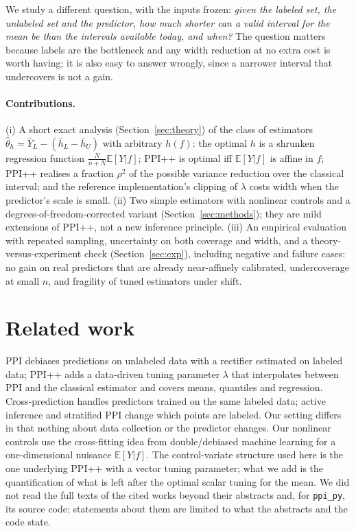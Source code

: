 \documentclass{article}
\newcommand{\E}{\mathbb{E}}
\begin{document}
We study a different question, with the inputs frozen: \emph{given the labeled set, the unlabeled set and the predictor, how much shorter can a valid interval for the mean be than the intervals available today, and when?} The question matters because labels are the bottleneck and any width reduction at no extra cost is worth having; it is also easy to answer wrongly, since a narrower interval that undercovers is not a gain.

\paragraph{Contributions.}
(i) A short exact analysis (Section~\ref{sec:theory}) of the class of estimators $\hat\theta_h=\bar Y_L-(\bar h_L-\bar h_U)$ with arbitrary $h(f)$: the optimal $h$ is a shrunken regression function $\tfrac{N}{n+N}\E[Y|f]$; PPI++ is optimal iff $\E[Y|f]$ is affine in $f$; PPI++ realises a fraction $\rho^2$ of the possible variance reduction over the classical interval; and the reference implementation's clipping of $\lambda$ costs width when the predictor's scale is small. (ii) Two simple estimators with nonlinear controls and a degrees-of-freedom-corrected variant (Section~\ref{sec:methods}); they are mild extensions of PPI++, not a new inference principle. (iii) An empirical evaluation with repeated sampling, uncertainty on both coverage and width, and a theory-versus-experiment check (Section~\ref{sec:exp}), including negative and failure cases: no gain on real predictors that are already near-affinely calibrated, undercoverage at small $n$, and fragility of tuned estimators under shift.

\section{Related work}
PPI \citep{angelopoulos2023ppi} debiases predictions on unlabeled data with a rectifier estimated on labeled data; PPI++ \citep{angelopoulos2023ppipp} adds a data-driven tuning parameter $\lambda$ that interpolates between PPI and the classical estimator and covers means, quantiles and regression. Cross-prediction \citep{zrnic2023cross} handles predictors trained on the same labeled data; active inference \citep{zrnic2024active} and stratified PPI \citep{fisch2024stratified} change which points are labeled. Our setting differs in that nothing about data collection or the predictor changes. Our nonlinear controls use the cross-fitting idea from double/debiased machine learning \citep{chernozhukov2016dml} for a one-dimensional nuisance $\E[Y|f]$. The control-variate structure used here is the one underlying PPI++ with a vector tuning parameter; what we add is the quantification of what is left after the optimal scalar tuning for the mean. We did not read the full texts of the cited works beyond their abstracts and, for \texttt{ppi\_py}, its source code; statements about them are limited to what the abstracts and the code state.
\end{document}
